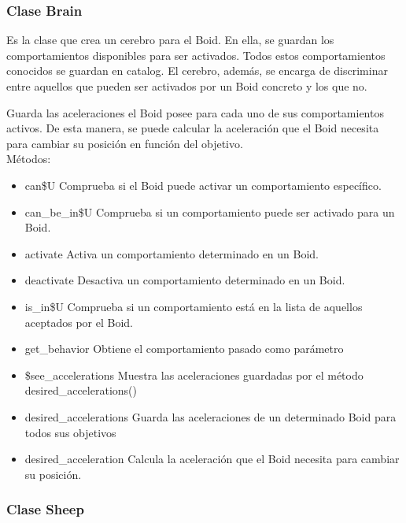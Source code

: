 \subsubsection{Clase Brain}
\label{subsubsection:brain}

Es la clase que crea un cerebro para el Boid. En ella, se guardan los comportamientos disponibles para ser activados. Todos estos 
comportamientos conocidos se guardan en catalog. El cerebro, además, se encarga de discriminar entre aquellos que pueden ser activados por 
un Boid concreto y los que no.

Guarda las aceleraciones el Boid posee para cada uno de sus comportamientos activos. De esta manera, se puede calcular la aceleración que 
el Boid necesita para cambiar su posición en función del objetivo.\\


Métodos:
\begin{itemize}
\item can\$U
Comprueba si el Boid puede activar un comportamiento específico.

\item can\_be\_in\$U
Comprueba si un comportamiento puede ser activado para un Boid.

\item activate
Activa un comportamiento determinado en un Boid.

\item deactivate
Desactiva un comportamiento determinado en un Boid.

\item is\_in\$U
Comprueba si un comportamiento está en la lista de aquellos aceptados por el Boid.

\item get\_behavior
Obtiene el comportamiento pasado como parámetro

\item \$see\_accelerations
Muestra las aceleraciones guardadas por el método desired\_accelerations()

\item desired\_accelerations
Guarda las aceleraciones de un determinado Boid para todos sus objetivos

\item desired\_acceleration
Calcula la aceleración que el Boid necesita para cambiar su posición.
\end{itemize}



\subsubsection{Clase Sheep}
\label{subsubsection:sheep}

